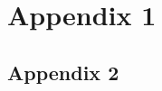 
\appendix
{}

\section{Appendix 1}
\label{sub:appendix_1}

\subsection{Appendix 2}
\label{sub:appendix_2}
